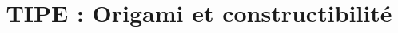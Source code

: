 \documentclass[a4paper,12pt,french]{report}
\title{TIPE : Origami et constructibilité}
\begin{document}
\renewcommand{\contentsname}{Sommaire}
\end{document}
